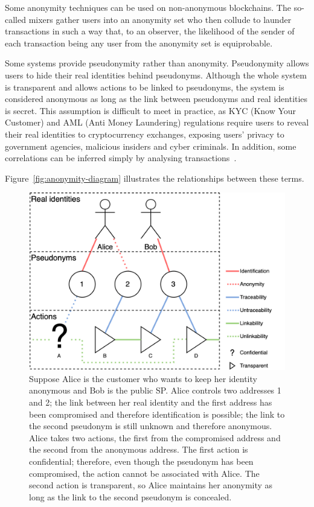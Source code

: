 \documentclass[pdftex,twocolumn,epjc3]{svjour3}
\begin{document}
{Some anonymity techniques can be used on non-anonymous blockchains. The so-called mixers gather users into an anonymity set who then collude to launder transactions in such a way that, to an observer, the likelihood of the sender of each transaction being any user from the anonymity set is equiprobable.

Some systems provide pseudonymity rather than anonymity. Pseudonymity allows users to hide their real identities behind pseudonyms. Although the whole system is transparent and allows actions to be linked to pseudonyms, the system is considered anonymous as long as the link between pseudonyms and real identities is secret. This assumption is difficult to meet in practice, as KYC (Know Your Customer) and AML (Anti Money Laundering) regulations require users to reveal their real identities to cryptocurrency exchanges, exposing users' privacy to government agencies, malicious insiders and cyber criminals. In addition, some correlations can be inferred simply by analysing transactions~\cite{androulakiEvaluatingUserPrivacy2013, oberStructureAnonymityBitcoin2013}.

Figure~\ref{fig:anonymity-diagram} illustrates the relationships between these terms.

\begin{figure}[h!]
\includegraphics[width=\linewidth]{anonymity-diagram.png}
\centering
\caption{Suppose Alice is the customer who wants to keep her identity anonymous and Bob is the public SP. Alice controls two addresses 1 and 2; the link between her real identity and the first address has been compromised and therefore identification is possible; the link to the second pseudonym is still unknown and therefore anonymous. Alice takes two actions, the first from the compromised address and the second from the anonymous address. The first action is confidential; therefore, even though the pseudonym has been compromised, the action cannot be associated with Alice. The second action is transparent, so Alice maintains her anonymity as long as the link to the second pseudonym is concealed.}


\end{figure}}
\end{document}
